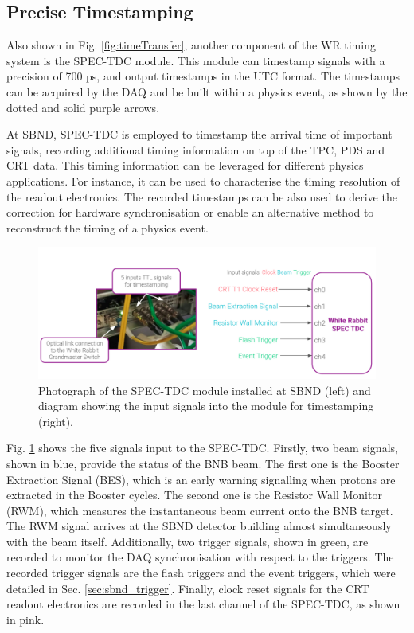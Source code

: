 \subsection{Precise Timestamping}
\label{subsec42TimeRef}

Also shown in Fig. \ref{fig:timeTransfer}, another component of the WR timing system is the SPEC-TDC module.
This module can timestamp signals with a precision of 700 ps, and output timestamps in the UTC format.
The timestamps can be acquired by the DAQ and be built within a physics event, as shown by the dotted and solid purple arrows. 

At SBND, SPEC-TDC is employed to timestamp the arrival time of important signals, recording additional timing information on top of the TPC, PDS and CRT data.
This timing information can be leveraged for different physics applications.
For instance, it can be used to characterise the timing resolution of the readout electronics.
The recorded timestamps can be also used to derive the correction for hardware synchronisation or enable an alternative method to reconstruct the timing of a physics event. 

\begin{figure}[b!] 
\centering    
\includegraphics[width=1.0\textwidth]{SPEC_TDC}
\caption[SPEC-TDC Module Photograph and Signal Inputs]{
Photograph of the SPEC-TDC module installed at SBND (left) and diagram showing the input signals into the module for timestamping (right).
}
\label{fig:SPECTDC}
\end{figure}

Fig. \ref{fig:SPECTDC} shows the five signals input to the SPEC-TDC. 
Firstly, two beam signals, shown in blue, provide the status of the BNB beam.
The first one is the Booster Extraction Signal (BES), which is an early warning signalling when protons are extracted in the Booster cycles.
The second one is the Resistor Wall Monitor (RWM), which measures the instantaneous beam current onto the BNB target.
The RWM signal arrives at the SBND detector building almost simultaneously with the beam itself.
Additionally, two trigger signals, shown in green, are recorded to monitor the DAQ synchronisation with respect to the triggers. 
The recorded trigger signals are the flash triggers and the event triggers, which were detailed in Sec. \ref{sec:sbnd_trigger}.
Finally, clock reset signals for the CRT readout electronics are recorded in the last channel of the SPEC-TDC, as shown in pink. 

